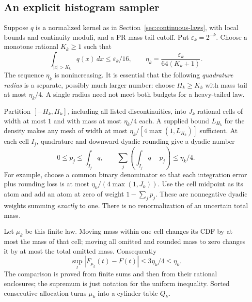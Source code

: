 \subsection{An explicit histogram sampler}

Suppose $q$ is a normalized kernel as in Section~\ref{sec:continuous-laws},
with local bounds and continuity moduli, and a PR mass-tail cutoff. Put
$\varepsilon_k=2^{-k}$. Choose a monotone rational $K_k\ge1$ such that
\[
 \int_{|x|>K_k}q(x)\,dx\le\varepsilon_k/16,
 \qquad
 \eta_k=\frac{\varepsilon_k}{64(K_k+1)}.
\]
The sequence $\eta_k$ is nonincreasing. It is essential that the following
\emph{quadrature radius} is a separate, possibly much larger number: choose
$H_k\ge K_k$ with mass tail at most $\eta_k/4$. A single radius need not
meet both budgets for a heavy-tailed law.

Partition $[-H_k,H_k]$, including all listed discontinuities, into $J_k$
rational cells of width at most $1$ and with mass at most $\eta_k/4$ each.
A supplied bound $L_{H_k}$ for the density makes any mesh of width at most
$\eta_k/[4\max(1,L_{H_k})]$ sufficient. At each cell $I_j$, quadrature
and downward dyadic rounding give a dyadic number
\[
 0\le p_j\le\int_{I_j}q,
 \qquad
 \sum_j\left(\int_{I_j}q-p_j\right)\le\eta_k/4.
\]
For example, choose a common binary denominator so that each integration
error plus rounding loss is at most $\eta_k/(4\max(1,J_k))$.
Use the cell midpoint as its atom and add an atom at zero of weight
$1-\sum_jp_j$. These are nonnegative dyadic weights summing \emph{exactly}
to one. There is no renormalization of an uncertain total mass.

Let $\mu_k$ be this finite law. Moving mass within one cell changes its CDF
by at most the mass of that cell; moving all omitted and rounded mass to
zero changes it by at most the total omitted mass. Consequently
\begin{equation}\label{eq:histogram-cdf}
 \sup_t|F_{\mu_k}(t)-F(t)|\le3\eta_k/4\le\eta_k.
\end{equation}
The comparison is proved from finite sums and then from their rational
enclosures; the supremum is just notation for the uniform inequality.
Sorted consecutive allocation turns $\mu_k$ into a cylinder table $Q_k$.

